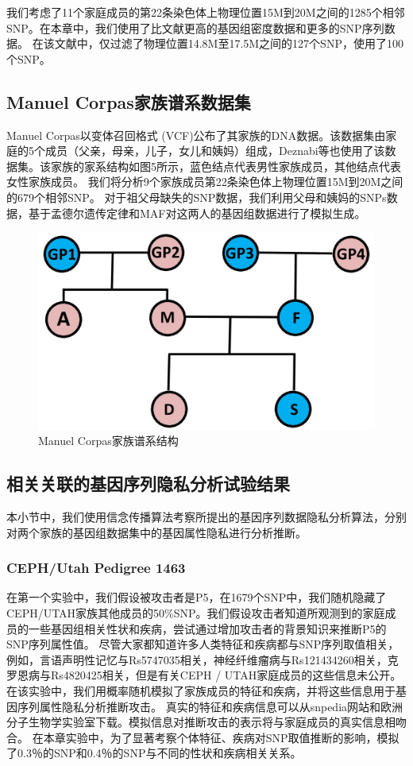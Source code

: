 我们考虑了11个家庭成员的第22条染色体上物理位置15M到20M之间的1285个相邻SNP。在本章中，我们使用了比文献\cite{deznabi2018inference}更高的基因组密度数据和更多的SNP序列数据。 在该文献中，仅过滤了物理位置14.8M至17.5M之间的127个SNP，使用了100个SNP。

\subsection{Manuel Corpas家族谱系数据集}
Manuel Corpas以变体召回格式 (VCF)公布了其家族的DNA数据。该数据集由家庭的5个成员（父亲，母亲，儿子，女儿和姨妈）组成，Deznabi等\cite{deznabi2018inference}也使用了该数据集。该家族的家系结构如图5所示，蓝色结点代表男性家族成员，其他结点代表女性家族成员。
我们将分析9个家族成员第22条染色体上物理位置15M到20M之间的679个相邻SNP。 对于祖父母缺失的SNP数据，我们利用父母和姨妈的SNPs数据，基于孟德尔遗传定律和MAF对这两人的基因组数据进行了模拟生成。

\begin{figure}[htbp]
	\centering
	\includegraphics[width=0.6\linewidth]{./figures/Manuel-Corpas-Family-Pedigree.jpg}
	\centering
	\caption{Manuel Corpas家族谱系结构}\label{fig:Manuel-Corpas-Family-Pedigree}
\end{figure}

\subsection{相关关联的基因序列隐私分析试验结果}
本小节中，我们使用信念传播算法考察所提出的基因序列数据隐私分析算法，分别对两个家族的基因组数据集中的基因属性隐私进行分析推断。

\subsubsection{CEPH/Utah Pedigree 1463}

在第一个实验中，我们假设被攻击者是P5，在1679个SNP中，我们随机隐藏了CEPH/UTAH家族其他成员的50\%SNP。我们假设攻击者知道所观测到的家庭成员的一些基因组相关性状和疾病，尝试通过增加攻击者的背景知识来推断P5的SNP序列属性值。 尽管大家都知道许多人类特征和疾病都与SNP序列取值相关，例如，言语声明性记忆与Rs5747035相关，神经纤维瘤病与Rs121434260相关，克罗恩病与Rs4820425相关，但是有关CEPH / UTAH家庭成员的这些信息未公开。 在该实验中，我们用概率随机模拟了家族成员的特征和疾病，并将这些信息用于基因序列属性隐私分析推断攻击。 真实的特征和疾病信息可以从snpedia网站和欧洲分子生物学实验室下载。模拟信息对推断攻击的表示将与家庭成员的真实信息相吻合。 在本章实验中，为了显著考察个体特征、疾病对SNP取值推断的影响，模拟了0.3％的SNP和0.4％的SNP与不同的性状和疾病相关关系。

